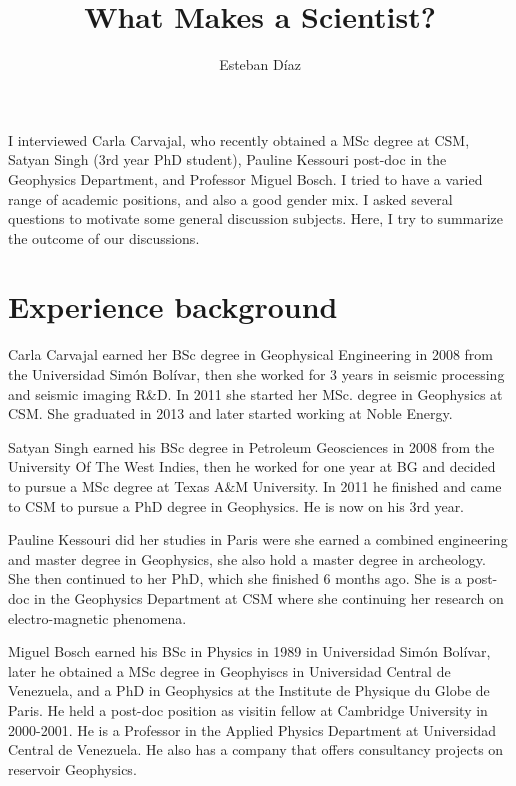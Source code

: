 \documentclass[11pt]{article}
\author{Esteban D\'{i}az}
\title{What Makes a Scientist?}{}
\begin{document}
\maketitle

I interviewed Carla Carvajal, who recently obtained a MSc degree at CSM, 
Satyan Singh (3rd year PhD student), Pauline Kessouri post-doc in the Geophysics Department, 
and Professor Miguel Bosch. I tried to have a varied range of academic positions, and 
also a good gender mix. I asked several questions to motivate some general discussion
subjects. Here, I try to summarize the outcome of our discussions. 


\section{Experience background}
Carla Carvajal earned her BSc degree in Geophysical Engineering in 2008 from  the Universidad Simón Bolívar, then 
she worked for 3 years in seismic processing and seismic imaging R\&D. In 2011 she started
her MSc. degree in Geophysics at CSM. She graduated in 2013 and later started working at
Noble Energy. 

Satyan Singh earned his BSc degree in Petroleum Geosciences in  2008 from the University Of The West Indies, then 
he worked for one year at BG and decided to pursue a MSc degree at Texas A\&M University. In 2011 he finished
and came to CSM to pursue a PhD degree in Geophysics. He is now on his 3rd year. 

Pauline Kessouri did her studies in Paris were she earned a combined engineering and master degree in Geophysics,
 she also hold a master degree in archeology. She then continued to her PhD, which she finished 6 months ago. 
She is a post-doc in the Geophysics Department at CSM where she continuing her research on electro-magnetic phenomena. 

Miguel Bosch earned his BSc in Physics in 1989 in Universidad Simón Bolívar, later he obtained a MSc 
degree in Geophyiscs in Universidad Central de Venezuela, and a PhD in Geophysics at the Institute de Physique du Globe 
de Paris. He held a post-doc position as visitin fellow at Cambridge University in 2000-2001. He is a Professor 
in the Applied Physics Department at Universidad Central de Venezuela. He also has a company that offers
consultancy projects on reservoir Geophysics. 
\end{document}
